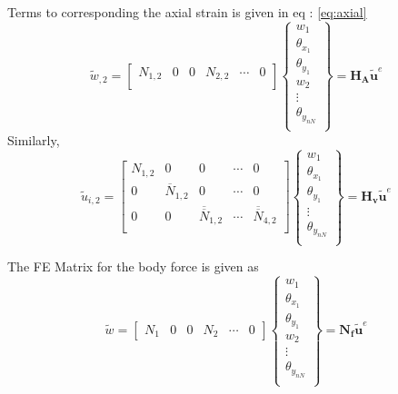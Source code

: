 \documentclass[main.tex]{subfiles}
\begin{document}
Terms to corresponding the axial strain is given in eq : \ref{eq:axial}
\begin{equation}\label{eq:axial}
\tilde{w}_{,2} = 
\begin{bmatrix}
{N}_{1,2} & 0 & 0 &{N}_{2,2} & \cdots & 0 \\ 
\end{bmatrix} 
\left\{
\begin{array}{r}
w_1 \\
\theta_{x_1} \\
\theta_{y_1} \\
w_{2} \\
\vdots \\
\theta_{y_{nN}} \\
\end{array} \right\}=\mathbf{ H_A }\tilde{\mathbf{u}}^e
\end{equation}
Similarly,
\begin{equation}
\tilde{u}_{i,2} = 
\begin{bmatrix}
{N}_{1,2} & 0 & 0 & \cdots & 0 \\
0 & \overline{N}_{1,2} & 0 & \cdots & 0 \\ 
0 & 0 & \overline{\overline{N}}_{1,2} & \cdots & \overline{\overline{N}}_{4,2} \\ 
\end{bmatrix} 
\left\{
\begin{array}{r}
w_1 \\
\theta_{x_1} \\
\theta_{y_1} \\
\vdots \\
\theta_{y_{nN}} \\
\end{array} \right\}=\mathbf{ H_v }\tilde{\mathbf{u}}^e
\end{equation}



The FE Matrix for the body force is given as
\begin{equation}
\tilde{w} = 
\begin{bmatrix}
{N}_{1} & 0 & 0 &{N}_{2} &\cdots & 0 
\end{bmatrix} 
\left\{
\begin{array}{r}
w_1 \\
\theta_{x_1} \\
\theta_{y_1} \\
w_2 \\
\vdots \\
\theta_{y_{nN}} \\
\end{array} \right\}=\mathbf{ N_f }\tilde{\mathbf{u}}^e
\end{equation}
\end{document}
